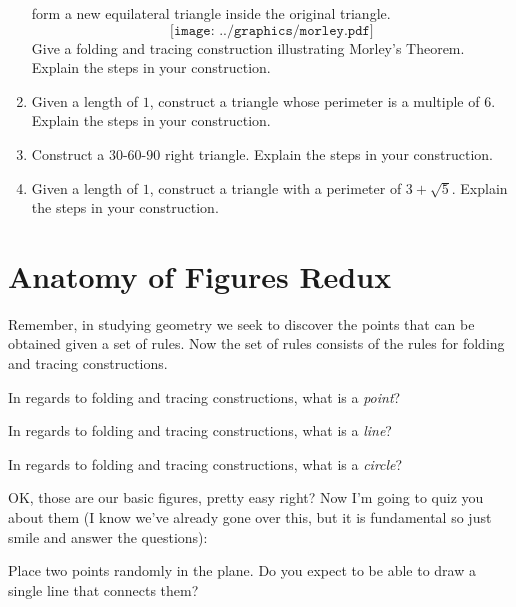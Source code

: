 \begin{problems}
\begin{enumerate}
form a new equilateral triangle inside the original triangle.
\[
\texttt{[image: ../graphics/morley.pdf]}
\]
Give a folding and tracing construction illustrating Morley's Theorem. Explain the
steps in your construction.
\item Given a length of $1$, construct a triangle whose perimeter is a
  multiple of $6$. Explain the steps in your construction.
\item Construct a $30$-$60$-$90$ right triangle. Explain the steps in your
  construction.
\item Given a length of $1$, construct a triangle with a perimeter of
  $3 + \sqrt{5}$. Explain the steps in your construction.
\end{enumerate}
\end{problems}

\newpage


\section{Anatomy of Figures Redux}


Remember, in studying geometry we seek to discover the points that can
be obtained given a set of rules. Now the set of rules consists of the
rules for folding and tracing constructions.

\begin{question} 
In regards to folding and tracing constructions, what is a \textit{point}?
\end{question}
\QM

\begin{question}
In regards to folding and tracing constructions, what is a \textit{line}?
\end{question}
\QM


\begin{question}
In regards to folding and tracing constructions, what is a \textit{circle}?
\end{question}
\QM


OK, those are our basic figures, pretty easy right? Now I'm going to
quiz you about them (I know we've already gone over this, but it is
fundamental so just smile and answer the questions):

\begin{question} 
Place two points randomly in the plane. Do you expect to be able to
draw a single line that connects them?
\end{question}
\QM

